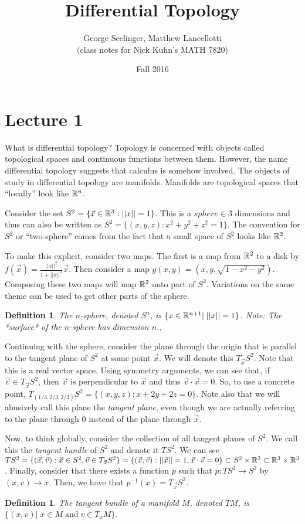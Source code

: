 \documentclass[11pt,leqno,oneside]{amsart}
\title[Differential Topology]{Differential Topology}
\author{George Seelinger, Matthew Lancellotti\\ (class notes for Nick Kuhn's MATH 7820)}
\date{Fall 2016}
\theoremstyle{mystyle} \newtheorem{thrm}[thm]{Theorem}
\theoremstyle{mystyle} \newtheorem{defi}[thm]{Definition}
\begin{document}
\maketitle
\section{Lecture 1}

What is differential topology? Topology is concerned with objects called
topological spaces and continuous functions between them. However, the name
differential topology suggests that calculus is somehow involved. The objects of
study in differential topology are manifolds. Manifolds are topological spaces
that ``locally'' look like ${\mathbb R}^n$.
\begin{example}
	Consider the set $S^2 = \{ \vec{x} \in {\mathbb R}^3: ||x||=1\}$. This is a $sphere \in 3$ dimensions and thus can also be written as $S^2 = \{(x,y,z) :
	x^2+y^2+z^2=1\}$. The convention for $S^2$ or ``two-sphere'' comes from the
	fact that a small space of $S^2$ looks like ${\mathbb R}^2$.

	To make this explicit, consider two maps. The first is a map from ${\mathbb R}^2$ to
	a disk by $f(\vec{x}) = \frac{||x||^2}{1+||x||^2} \vec{x}$. Then consider a
	map $g(x,y) = (x,y,\sqrt{1-x^2-y^2})$. Composing these two maps will map
	${\mathbb R}^2$ onto part of $S^2$. Variations on the same theme can be used to get
	other parts of the sphere.
\end{example}
\begin{defi}
	The \emph{$n$-sphere}, denoted $S^n$, is $\{x \in {\mathbb R}^{n+1} |\; ||x||=1 \}$. Note: The *surface* of the $n$-sphere has dimension $n$.,
\end{defi}
\begin{example}
	Continuing with the sphere, consider the plane through the origin that is parallel to the tangent plane of $S^2$ at some
	point $\vec{x}$. We will denote this $T_{\vec{x}}S^2$. Note that this is a
	real vector space. Using symmetry arguments, we can see that, if $\vec{v}
	\in T_{\vec{x}}S^2$, then $\vec{v}$ is perpendicular to $\vec{x}$ and thus
	$\vec{v} \cdot \vec{x} = 0$. So, to use a concrete point,
	$T_{(1/3,2/3,2/3)} S^2 = \{(x,y,z) : x+2y+2z=0\}$.  Note also that we will abusively call this plane the \emph{tangent plane}, even though we are actually referring to the plane through $0$ instead of the plane through $\vec{x}$.
\end{example}
\begin{example}
	Now, to think globally, consider the collection of all tangent planes of
	$S^2$. We call this the \emph{tangent bundle} of $S^2$ and denote it
	$TS^2$. We can see $TS^2 = \{(\vec{x}, \vec{v}): \vec{x} \in S^2, \vec{v}
	\in T_{\vec{x}} S^2\} = \{(\vec{x},\vec{v}) : ||\vec{x}|| = 1, \vec{x}
	\cdot \vec{v} = 0\} \subset S^2 \times {\mathbb R}^3 \subset {\mathbb R}^3 \times {\mathbb R}^3$.
	Finally, consider that there exists a function $p$ such that $p: TS^2 \to
	S^2$ by $(x,v) \to x$. Then, we have that $p^{-1}(x) = T_{\vec{x}}S^2$.
\end{example}
\begin{defi}
	The \emph{tangent bundle} of a manifold $M$, denoted $TM$, is $\{ (x,v) |\; x \in M \;\text{and}\; v \in T_xM \}$.
\end{defi}
\end{document}

